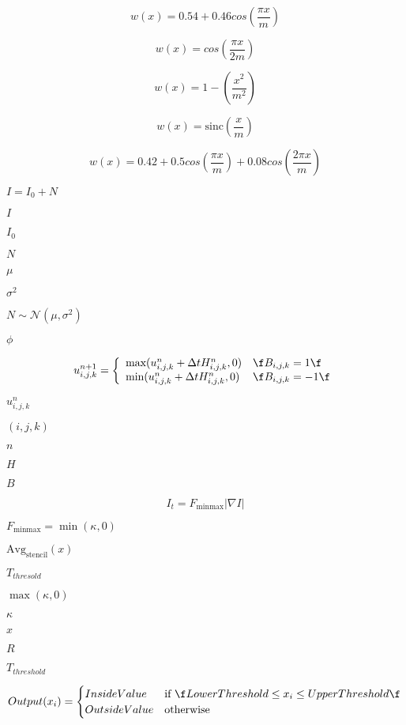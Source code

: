 \documentclass{article}
\begin{document}
\[ w(x) = 0.54 + 0.46 cos(\frac{\pi x}{m} ) \]
\pagebreak

\[ w(x) = cos(\frac{\pi x}{2 m} ) \]
\pagebreak

\[ w(x) = 1 - ( \frac{x^2}{m^2} ) \]
\pagebreak

\[ w(x) = \textrm{sinc} ( \frac{x}{m} ) \]
\pagebreak

\[ w(x) = 0.42 + 0.5 cos(\frac{\pi x}{m}) + 0.08 cos(\frac{2 \pi x}{m}) \]
\pagebreak

$ I = I_0 + N $
\pagebreak

$ I $
\pagebreak

$ I_0 $
\pagebreak

$ N $
\pagebreak

$ \mu $
\pagebreak

$ \sigma^2 $
\pagebreak

$ N \sim \mathcal{N}(\mu, \sigma^2) $
\pagebreak

$ \phi $
\pagebreak

\[ u_{i,j,k}^{n+1} = \left\{ \begin{array}{ll} \mbox{max} (u_{i,j,k}^{n} + \Delta t H_{i,j,k}^{n}, 0) & \mbox{\f$B_{i,j,k} = 1\f$} \\ \mbox{min} (u_{i,j,k}^{n} + \Delta t H_{i,j,k}^{n}, 0) & \mbox{\f$B_{i,j,k} = -1\f$} \end{array}\right. \]
\pagebreak

$ u_{i,j,k}^{n} $
\pagebreak

$ (i,j,k) $
\pagebreak

$ n $
\pagebreak

$ H $
\pagebreak

$ B $
\pagebreak

\[ I_t = F_{\mbox{minmax}} |\nabla I| \]
\pagebreak

$ F_{\mbox{minmax}} = \min(\kappa,0) $
\pagebreak

$ \mbox{Avg}_{\mbox{stencil}}(x) $
\pagebreak

$ T_{thresold} $
\pagebreak

$ \max(\kappa,0) $
\pagebreak

$ \kappa $
\pagebreak

$ x $
\pagebreak

$ R $
\pagebreak

$ T_{threshold} $
\pagebreak

\[ Output(x_i) = \begin{cases} InsideValue & \text{if \f$LowerThreshold \leq x_i \leq UpperThreshold\f$} \\ OutsideValue & \text{otherwise} \end{cases} \]
\pagebreak
\end{document}
